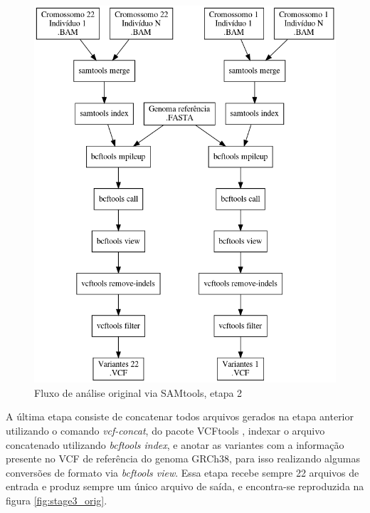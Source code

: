 \documentclass[cic,tc]{iiufrgs}
\begin{document}
\begin{figure}
  \caption{Fluxo de análise original via SAMtools, etapa 2}
    \begin{center}
      \includegraphics[width=0.85\linewidth]{img/stage2_orig.png}
    \end{center}
    \label{fig:stage2_orig}
\end{figure}

A última etapa consiste de concatenar todos arquivos gerados na etapa anterior
utilizando o comando \textit{vcf-concat}, do pacote
VCFtools \cite{10.1093/bioinformatics/btr330}, indexar o arquivo concatenado
utilizando \textit{bcftools index}, e anotar as variantes com a informação
presente no VCF de referência do genoma GRCh38, para isso realizando algumas
conversões de formato via \textit{bcftools view}. Essa etapa recebe sempre 22
arquivos de entrada e produz sempre um único arquivo de saída, e encontra-se
reproduzida na figura \ref{fig:stage3_orig}.
\end{document}
